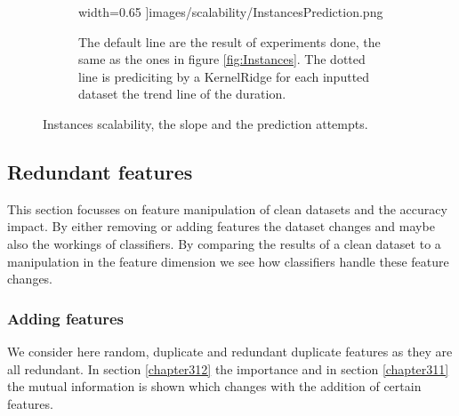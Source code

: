 \documentclass[a4paper,10pt]{article}
\begin{document}
\begin{figure}[H]
\begin{subfigure}[b]{0.45\textwidth}
	width=0.65\textwidth
	]{images/scalability/InstancesPrediction.png}
	\caption{The default line are the result of experiments done, the same as the ones in figure \ref{fig:Instances}. The dotted line is prediciting by a KernelRidge for each inputted dataset the trend line of the duration. }
	\label{fig:InstancesPred}
\end{subfigure}
	
	\caption{Instances scalability, the slope and the prediction attempts.}
	\label{fig:Inst}
\end{figure}

 

\newpage
\subsection{Redundant features}
This section focusses on feature manipulation of clean datasets and the accuracy impact. By either removing or adding features the dataset changes and maybe also the workings of classifiers. By comparing the results of a clean dataset to a manipulation in the feature dimension we see how classifiers handle these feature changes.

\subsubsection{Adding features}
We consider here random, duplicate and redundant duplicate features as they are all redundant. In section \ref{chapter312} the importance and in section \ref{chapter311} the mutual information is shown which changes with the addition of certain features.\\
\end{document}

